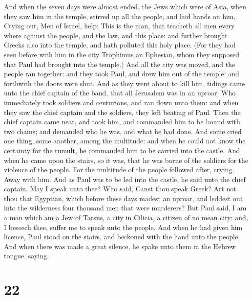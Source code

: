  And when the seven days were almost ended, the Jews
which were of Asia, when they saw him in the temple, stirred up all the
people, and laid hands on him,  Crying out, Men of
Israel, help: This is the man, that teacheth all men every where against
the people, and the law, and this place: and further brought Greeks also
into the temple, and hath polluted this holy place.  (For
they had seen before with him in the city Trophimus an Ephesian, whom
they supposed that Paul had brought into the temple.) 
And all the city was moved, and the people ran together: and they took
Paul, and drew him out of the temple: and forthwith the doors were shut.
 And as they went about to kill him, tidings came unto
the chief captain of the band, that all Jerusalem was in an uproar.
 Who immediately took soldiers and centurions, and ran
down unto them: and when they saw the chief captain and the soldiers,
they left beating of Paul.  Then the chief captain came
near, and took him, and commanded him to be bound with two chains; and
demanded who he was, and what he had done.  And some
cried one thing, some another, among the multitude: and when he could
not know the certainty for the tumult, he commanded him to be carried
into the castle.  And when he came upon the stairs, so it
was, that he was borne of the soldiers for the violence of the people.
 For the multitude of the people followed after, crying,
Away with him.  And as Paul was to be led into the
castle, he said unto the chief captain, May I speak unto thee? Who said,
Canst thou speak Greek?  Art not thou that Egyptian,
which before these days madest an uproar, and leddest out into the
wilderness four thousand men that were murderers?  But
Paul said, I am a man which am a Jew of Tarsus, a city in Cilicia, a
citizen of no mean city: and, I beseech thee, suffer me to speak unto
the people.  And when he had given him licence, Paul
stood on the stairs, and beckoned with the hand unto the people. And
when there was made a great silence, he spake unto them in the Hebrew
tongue, saying,

\hypertarget{section-21}{%
\section{22}\label{section-21}}

